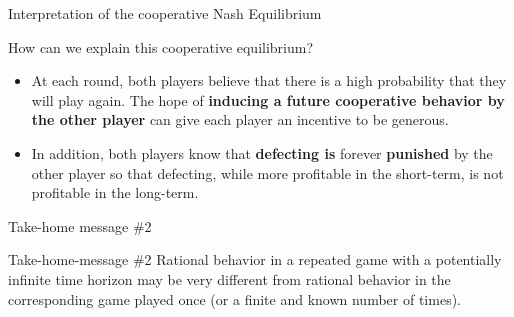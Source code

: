
\begin{frame}{Interpretation of the cooperative Nash Equilibrium}
    \begin{exampleblock}{How can we explain this cooperative equilibrium?}
        \begin{itemize}
            \item At each round, both players believe that there is a high probability that they
            will play again. The hope of \textbf{inducing a future cooperative behavior by the other
            player} can give each player an incentive to be generous.
            \item In addition, both players know that \textbf{defecting is} forever \textbf{punished} by
            the other player so that defecting, while more profitable in the short-term, is not profitable
            in the long-term.
        \end{itemize}
    \end{exampleblock}
\end{frame}

\begin{frame}{Take-home message \#2}
    \begin{block}{Take-home-message \#2}
        Rational behavior in a repeated game with a potentially infinite time horizon may be
        very different from rational behavior in the corresponding game played once (or a finite
        and known number of times).
    \end{block}
\end{frame}
